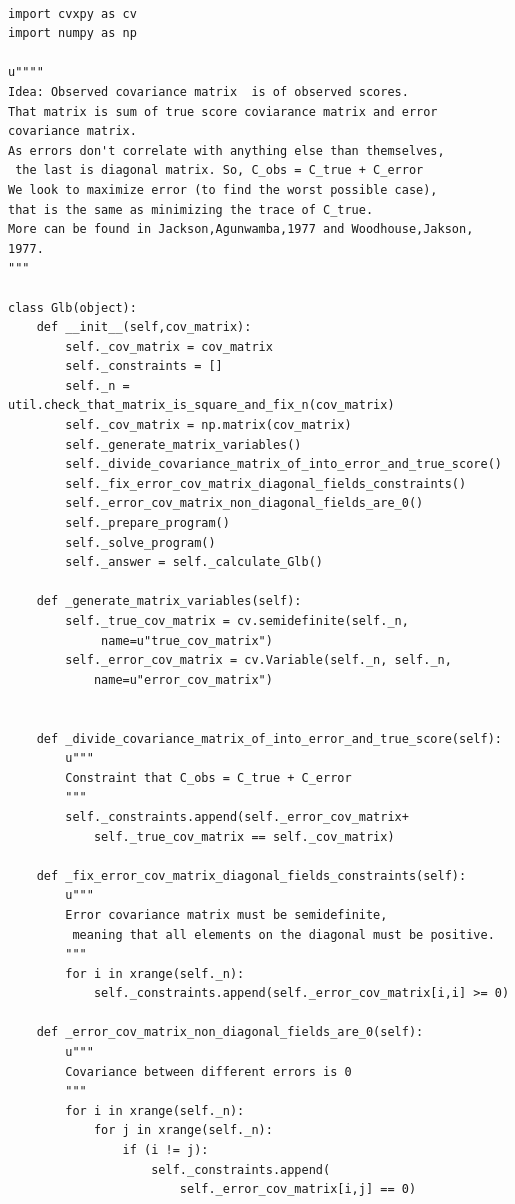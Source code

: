 \documentclass[a4paper,12pt,oneside]{article}
\newenvironment{customFloatWrap}{}{}
\numberwithin{equation}{section}
\theoremstyle{definition}
\begin{document}
\vspace{10pt}

\begin{customFloatWrap}
\begin{verbatim}

import cvxpy as cv
import numpy as np

u""""
Idea: Observed covariance matrix  is of observed scores. 
That matrix is sum of true score coviarance matrix and error covariance matrix.
As errors don't correlate with anything else than themselves,
 the last is diagonal matrix. So, C_obs = C_true + C_error
We look to maximize error (to find the worst possible case), 
that is the same as minimizing the trace of C_true.
More can be found in Jackson,Agunwamba,1977 and Woodhouse,Jakson, 1977.
"""

class Glb(object):
    def __init__(self,cov_matrix):
        self._cov_matrix = cov_matrix
        self._constraints = []
        self._n = util.check_that_matrix_is_square_and_fix_n(cov_matrix)
        self._cov_matrix = np.matrix(cov_matrix)
        self._generate_matrix_variables()
        self._divide_covariance_matrix_of_into_error_and_true_score()
        self._fix_error_cov_matrix_diagonal_fields_constraints()
        self._error_cov_matrix_non_diagonal_fields_are_0()
        self._prepare_program()
        self._solve_program()
        self._answer = self._calculate_Glb()

    def _generate_matrix_variables(self):
        self._true_cov_matrix = cv.semidefinite(self._n,
             name=u"true_cov_matrix")
        self._error_cov_matrix = cv.Variable(self._n, self._n, 
            name=u"error_cov_matrix") 
    
    
    def _divide_covariance_matrix_of_into_error_and_true_score(self):
        u"""
        Constraint that C_obs = C_true + C_error
        """
        self._constraints.append(self._error_cov_matrix+
            self._true_cov_matrix == self._cov_matrix)
        
    def _fix_error_cov_matrix_diagonal_fields_constraints(self):
        u"""
        Error covariance matrix must be semidefinite,
         meaning that all elements on the diagonal must be positive.
        """
        for i in xrange(self._n):
            self._constraints.append(self._error_cov_matrix[i,i] >= 0)

    def _error_cov_matrix_non_diagonal_fields_are_0(self):
        u"""
        Covariance between different errors is 0
        """
        for i in xrange(self._n):
            for j in xrange(self._n):
                if (i != j):
                    self._constraints.append(
                        self._error_cov_matrix[i,j] == 0) 


\end{verbatim}
\end{customFloatWrap}
\end{document}
